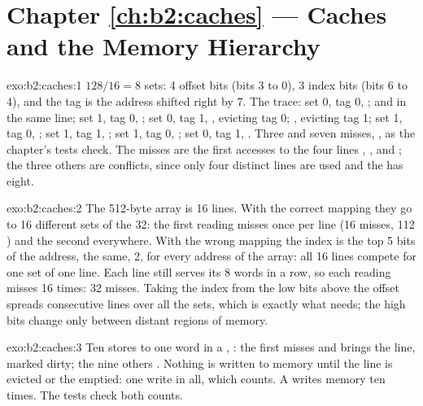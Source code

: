 \section*{Chapter \ref{ch:b2:caches} --- Caches and the Memory Hierarchy}

\begin{solution}{exo:b2:caches:1}
$128 / 16 = 8$ sets: 4 offset bits (bits 3 to 0), 3 index bits (bits 6 to 4), and the tag is the address shifted
right by 7. The trace:
 set 0, tag 0, ;  and   in the same line;  set 1, tag 0, ;
 set 0, tag 1, , evicting tag 0;  , evicting tag 1;  set 1, tag 0, ;
 set 1, tag 1, ;  set 1, tag 0, ;  set 0, tag 1, . Three  and seven
misses, , as the chapter's tests check. The  misses are the first accesses to the four
lines , ,  and ; the three others are conflicts, since only four
distinct lines are used and the  has eight.
\end{solution}

\begin{solution}{exo:b2:caches:2}
The 512-byte array is 16 lines. With the correct mapping they go to 16 different sets of the 32: the first reading
misses once per line (16 misses, 112 ) and the second  everywhere. With the wrong mapping the index is the
top 5 bits of the address, the same, 2, for every address of the array: all 16 lines compete for one set of one
line. Each line still serves its 8 words in a row, so each reading misses 16 times: 32 misses. Taking the index from
the low bits above the offset spreads consecutive lines over all the sets, which is exactly what 
needs; the high bits change only between distant regions of memory.
\end{solution}

\begin{solution}{exo:b2:caches:3}
Ten stores to one word in a ,  : the first misses and brings the line, marked dirty;
the nine others . Nothing is written to memory until the line is evicted or the  emptied: one write in all,
which  counts. A   writes memory ten times. The tests check both counts.
\end{solution}

